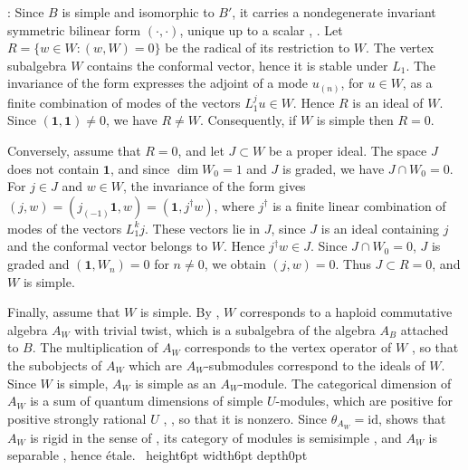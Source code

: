 \documentclass[leqno]{article}
\newcommand{\qed}{\hfill \vrule height6pt  width6pt depth0pt}
\newenvironment{proof}[1][]{\noindent {\it Proof #1} : }{\hbox{~}\qed
\smallskip
}
\numberwithin{equation}{section}
\begin{document}
\begin{proof}
Since $B$ is simple and isomorphic to $B'$, it carries a nondegenerate invariant symmetric bilinear form $(\cdot,\cdot)$, unique up to a scalar \cite{FHL93}, \cite{Li94}. Let $R = \{w \in W : (w,W) = 0\}$ be the radical of its restriction to $W$. The vertex subalgebra $W$ contains the conformal vector, hence it is stable under $L_1$. The invariance of the form expresses the adjoint of a mode $u_{(n)}$, for $u \in W$, as a finite combination of modes of the vectors $L_1^ju \in W$. Hence $R$ is an ideal of $W$. Since $(\mathbf 1,\mathbf 1) \neq 0$, we have $R \neq W$. Consequently, if $W$ is simple then $R = 0$.

Conversely, assume that $R = 0$, and let $J \subset W$ be a proper ideal. The space $J$ does not contain $\mathbf 1$, and since $\dim W_0 = 1$ and $J$ is graded, we have $J \cap W_0 = 0$. For $j \in J$ and $w \in W$, the invariance of the form gives $(j,w) = (j_{(-1)}\mathbf 1,w) = (\mathbf 1,j^\dagger w)$, where $j^\dagger$ is a finite linear combination of modes of the vectors $L_1^kj$. These vectors lie in $J$, since $J$ is an ideal containing $j$ and the conformal vector belongs to $W$. Hence $j^\dagger w \in J$. Since $J \cap W_0 = 0$, $J$ is graded and $(\mathbf 1,W_n) = 0$ for $n \neq 0$, we obtain $(j,w) = 0$. Thus $J \subset R = 0$, and $W$ is simple.

Finally, assume that $W$ is simple. By \cite[Theorem 3.2 p.~10]{HKL15}, $W$ corresponds to a haploid commutative algebra $A_W$ with trivial twist, which is a subalgebra of the algebra $A_B$ attached to $B$. The multiplication of $A_W$ corresponds to the vertex operator of $W$ \cite[proof of Theorem 3.2 p.~10]{HKL15}, so that the subobjects of $A_W$ which are $A_W$-submodules correspond to the ideals of $W$. Since $W$ is simple, $A_W$ is simple as an $A_W$-module. The categorical dimension of $A_W$ is a sum of quantum dimensions of simple $U$-modules, which are positive for positive strongly rational $U$ \cite[Lemma 4.2 p.~13]{DJX13}, \cite{Hua08}, so that it is nonzero. Since $\theta_{A_W} = \mathrm{id}$, \cite[Lemma 1.20 p.~15]{KiO02} shows that $A_W$ is rigid in the sense of \cite[Definition 1.11 p.~10]{KiO02}, its category of modules is semisimple \cite[Theorem 3.3 p.~17]{KiO02}, and $A_W$ is separable \cite[Proposition 2.7 p.~5]{DMNO13}, hence \'etale.
\end{proof}
\end{document}
